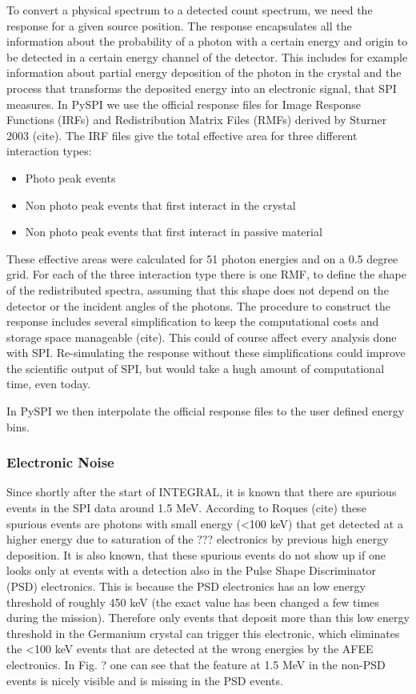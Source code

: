 \documentclass[twocolumn]{article}%
\begin{document}
To convert a physical spectrum to a detected count spectrum, we need the response for a given source position. The response encapsulates all the information about the probability of a photon with a certain energy and origin to be detected in a certain energy channel of the detector. This includes for example information about partial energy deposition of the photon in the crystal and the process that transforms the deposited energy into an electronic signal, that SPI measures.
In PySPI we use the official response files for Image Response Functions (IRFs) and Redistribution Matrix Files (RMFs) derived by Sturner 2003 (cite). The IRF files give the total effective area for three different interaction types:
\begin{itemize}
  \item Photo peak events
  \item Non photo peak events that first interact in the crystal
  \item Non photo peak events that first interact in passive material
\end{itemize}

These effective areas were calculated for 51 photon energies and on a 0.5 degree grid. For each of the three interaction type there is one RMF, to define the shape of the redistributed spectra, assuming that this shape does not depend on the detector or the incident angles of the photons.
The procedure to construct the response includes several simplification to keep the computational costs and storage space manageable (cite). This could of course affect every analysis done with SPI. Re-simulating the response without these simplifications could improve the scientific output of SPI, but would take a hugh amount of computational time, even today.

In PySPI we then interpolate the official response files to the user defined energy bins.

\subsubsection*{Electronic Noise}

Since shortly after the start of INTEGRAL, it is known that there are spurious events in the SPI data around 1.5 MeV. According to Roques (cite) these spurious events are photons with small energy (<100 keV) that get detected at a higher energy due to saturation of the ??? electronics by previous high energy deposition. It is also known, that these spurious events do not show up if one looks only at events with a detection also in the Pulse Shape Discriminator (PSD) electronics. This is because the PSD electronics has an low energy threshold of roughly 450 keV (the exact value has been changed a few times during the mission). Therefore only events that deposit more than this low energy threshold in the Germanium crystal can trigger this electronic, which eliminates the <100 keV events that are detected at the wrong energies by the AFEE electronics. In Fig. ? one can see that the feature at 1.5 MeV in the non-PSD events is nicely visible and is missing in the PSD events.
\end{document}
